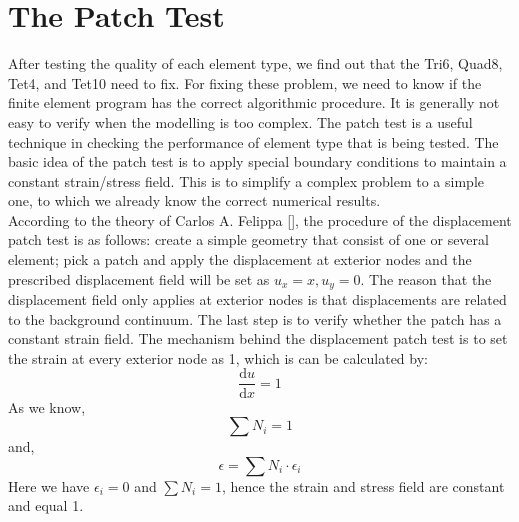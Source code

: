 \section{The Patch Test}
After testing the quality of each element type, we find out that the Tri6, Quad8, Tet4, and Tet10 need to fix. For fixing these problem, we need to know if the finite element program has the correct algorithmic procedure. It is generally not easy to verify when the modelling is too complex. The patch test is a useful technique in checking the performance of element type that is being tested. The basic idea of the patch test is to apply special boundary conditions to maintain a constant strain/stress field. This is to simplify a complex problem to a simple one, to which we already know the correct numerical results. \\
According to the theory of Carlos A. Felippa [\cite{Felippa}], the procedure of the displacement patch test is as follows: create a simple geometry that consist of one or several element; pick a patch and apply the displacement at exterior nodes and the prescribed displacement field will be set as $u_x = x, u_y = 0$. The reason that the displacement field only applies at exterior nodes is that displacements are related to the background continuum. The last step is to verify whether the patch has a constant strain field. The mechanism behind the displacement patch test is to set the strain at every exterior node as 1, which is can be calculated by:
\begin{equation}
\frac{\mathrm d u}{\mathrm d x} = 1
\end{equation}
As we know, 
\begin{equation}
\sum N_i = 1
\end{equation}
and, 
\begin{equation}
\epsilon = \sum N_i \cdot \epsilon_{i}
\end{equation}
Here we have $\epsilon_i = 0$ and $\sum N_i = 1$, hence the strain and stress field are constant and equal 1. \\

